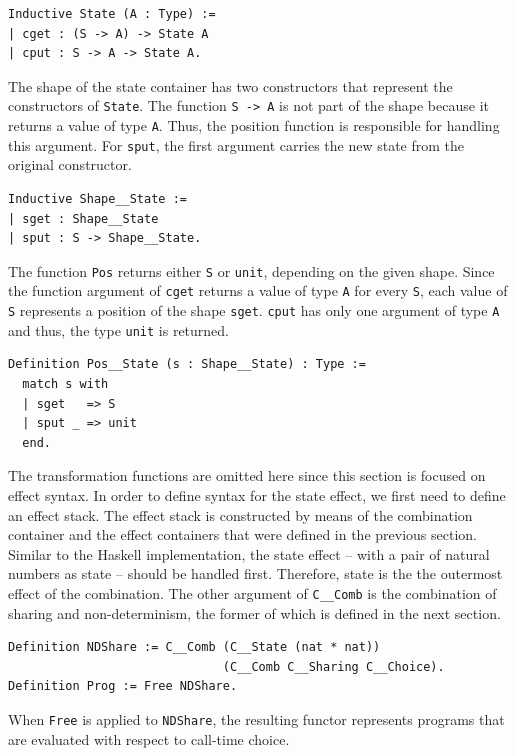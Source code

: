 \documentclass[a4paper, 11pt, fleqn, twoside]{scrreprt}
\newcommand{\cinl}[1]{\texttt{#1}}
\begin{document}
\begin{verbatim}
Inductive State (A : Type) :=
| cget : (S -> A) -> State A
| cput : S -> A -> State A.
\end{verbatim}

The shape of the state container has two constructors that represent the constructors of \cinl{State}.
The function \cinl{S -> A} is not part of the shape because it returns a value of type \cinl{A}.
Thus, the position function is responsible for handling this argument.
For \cinl{sput}, the first argument carries the new state from the original constructor.

\begin{verbatim}
Inductive Shape__State :=
| sget : Shape__State
| sput : S -> Shape__State.
\end{verbatim}

The function \cinl{Pos} returns either \cinl{S} or \cinl{unit}, depending on the given shape.
Since the function argument of \cinl{cget} returns a value of type \cinl{A} for every \cinl{S}, each value of \cinl{S} represents a position of the shape \cinl{sget}.
\cinl{cput} has only one argument of type \cinl{A} and thus, the type \cinl{unit} is returned.

\begin{verbatim}
Definition Pos__State (s : Shape__State) : Type :=
  match s with
  | sget   => S
  | sput _ => unit
  end.
\end{verbatim}

The transformation functions are omitted here since this section is focused on effect syntax.
In order to define syntax for the state effect, we first need to define an effect stack.
The effect stack is constructed by means of the combination container and the effect containers that were defined in the previous section.
Similar to the Haskell implementation, the state effect -- with a pair of natural numbers as state -- should be handled first.
Therefore, state is the the outermost effect of the combination.
The other argument of \cinl{C__Comb} is the combination of sharing and non-determinism, the former of which is defined in the next section.
 
\begin{verbatim}
Definition NDShare := C__Comb (C__State (nat * nat)) 
                              (C__Comb C__Sharing C__Choice).
Definition Prog := Free NDShare.
\end{verbatim}

When \cinl{Free} is applied to \cinl{NDShare}, the resulting functor represents programs that are evaluated with respect to call-time choice.
\end{document}
